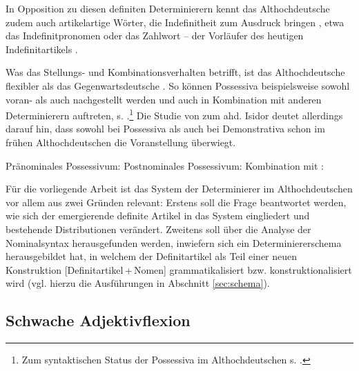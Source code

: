 In Opposition zu diesen definiten Determinierern kennt das Althochdeutsche zudem auch artikelartige Wörter, die Indefinitheit zum Ausdruck bringen \parencite[vgl. z.B.][253f.]{Braune2004}, etwa das Indefinitpronomen  \parencite{Donhauser2012} oder das Zahlwort  -- der Vorläufer des heutigen Indefinitartikels \parencite{Oubouzar2000,Szczepaniak2016a}. 

Was das Stellungs- und Kombinationsverhalten betrifft, ist das Althochdeutsche  flexibler als das Gegenwartsdeutsche \parencite[vgl.][104]{Szczepaniak2011a}. So können Possessiva beispielsweise sowohl voran- als auch nachgestellt werden und auch in Kombination mit anderen Determinierern auftreten, s.  \parencite[Beispiele aus][27f.]{Schrodt2004}.\footnote{Zum syntaktischen Status der Possessiva im Althochdeutschen s. \textcite[132ff.]{Demske2001}.} Die Studie von \textcite{Flick2018} zum ahd. Isidor deutet allerdings darauf hin, dass sowohl bei Possessiva als auch bei Demonstrativa schon im frühen Althochdeutschen die Voranstellung überwiegt.

\begin{exe}
	\ex \label{ex:poss-stellung}   
	\begin{xlist}
		\ex \label{ex:possvor} Pränominales Possessivum:  
		\ex \label{ex:possnach} Postnominales Possessivum:   
		\ex \label{ex:posskombi} Kombination mit :  
		\end{xlist}
\end{exe}


Für die vorliegende Arbeit ist das System der Determinierer im Althochdeutschen  vor allem aus zwei Gründen relevant: Erstens soll die Frage beantwortet werden, wie sich der emergierende definite Artikel in das System eingliedert und bestehende Distributionen verändert. Zweitens soll über die Analyse der Nominalsyntax herausgefunden werden, inwiefern sich ein Determiniererschema herausgebildet hat, in welchem der Definitartikel als Teil einer neuen Konstruktion [Definitartikel\,+\,Nomen] grammatikalisiert bzw. konstruktionalisiert wird (vgl. hierzu die Ausführungen in Abschnitt \ref{sec:schema}). 

\subsection{Schwache Adjektivflexion} \label{schwache-Adjektivflexion}

